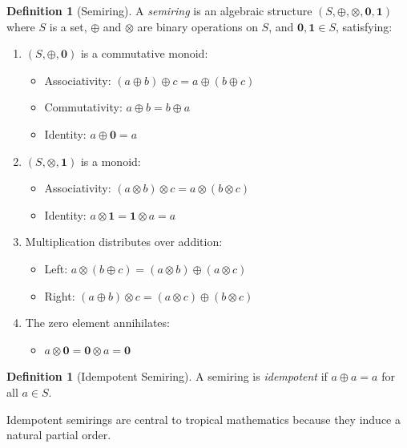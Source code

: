 \documentclass[11pt,a4paper]{article}
\theoremstyle{plain}
\theoremstyle{definition}
\newtheorem{definition}[theorem]{Definition}
\begin{document}
\begin{definition}[Semiring]
\label{def:semiring}
A \emph{semiring} is an algebraic structure $(S, \oplus, \otimes, \mathbf{0}, \mathbf{1})$ where $S$ is a set, $\oplus$ and $\otimes$ are binary operations on $S$, and $\mathbf{0}, \mathbf{1} \in S$, satisfying:
\begin{enumerate}[label=(\roman*)]
    \item $(S, \oplus, \mathbf{0})$ is a commutative monoid:
    \begin{itemize}
        \item Associativity: $(a \oplus b) \oplus c = a \oplus (b \oplus c)$
        \item Commutativity: $a \oplus b = b \oplus a$
        \item Identity: $a \oplus \mathbf{0} = a$
    \end{itemize}
    \item $(S, \otimes, \mathbf{1})$ is a monoid:
    \begin{itemize}
        \item Associativity: $(a \otimes b) \otimes c = a \otimes (b \otimes c)$
        \item Identity: $a \otimes \mathbf{1} = \mathbf{1} \otimes a = a$
    \end{itemize}
    \item Multiplication distributes over addition:
    \begin{itemize}
        \item Left: $a \otimes (b \oplus c) = (a \otimes b) \oplus (a \otimes c)$
        \item Right: $(a \oplus b) \otimes c = (a \otimes c) \oplus (b \otimes c)$
    \end{itemize}
    \item The zero element annihilates:
    \begin{itemize}
        \item $a \otimes \mathbf{0} = \mathbf{0} \otimes a = \mathbf{0}$
    \end{itemize}
\end{enumerate}
\end{definition}

\begin{definition}[Idempotent Semiring]
A semiring is \emph{idempotent} if $a \oplus a = a$ for all $a \in S$.
\end{definition}

Idempotent semirings are central to tropical mathematics because they induce a natural partial order.
\end{document}
